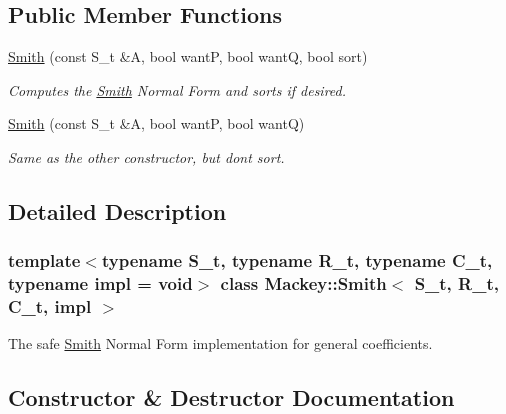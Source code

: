 \subsection*{Public Member Functions}
\begin{DoxyCompactItemize}
\item 
\hyperlink{classMackey_1_1Smith_a7923aafcefe7b2b12245dfb6f0700743}{Smith} (const S\+\_\+t \&A, bool wantP, bool wantQ, bool sort)
\begin{DoxyCompactList}\small\item\em Computes the \hyperlink{classMackey_1_1Smith}{Smith} Normal Form and sorts if desired. \end{DoxyCompactList}\item 
\hyperlink{classMackey_1_1Smith_a612e73ee01325c7adf0b7102d007a915}{Smith} (const S\+\_\+t \&A, bool wantP, bool wantQ)
\begin{DoxyCompactList}\small\item\em Same as the other constructor, but don\textquotesingle{}t sort. \end{DoxyCompactList}\end{DoxyCompactItemize}


\subsection{Detailed Description}
\subsubsection*{template$<$typename S\+\_\+t, typename R\+\_\+t, typename C\+\_\+t, typename impl = void$>$\newline
class Mackey\+::\+Smith$<$ S\+\_\+t, R\+\_\+t, C\+\_\+t, impl $>$}

The safe \hyperlink{classMackey_1_1Smith}{Smith} Normal Form implementation for general coefficients. 

\subsection{Constructor \& Destructor Documentation}
\mbox{\label{classMackey_1_1Smith_a7923aafcefe7b2b12245dfb6f0700743}} 
